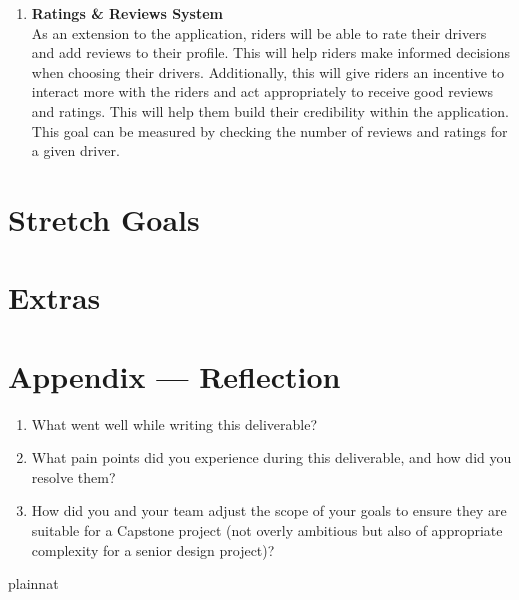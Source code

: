 \documentclass{article}
\begin{document}
\begin{enumerate}
\item \textbf{Ratings & Reviews System} \\
As an extension to the application, riders will be able to rate their drivers and add reviews to their profile. This will help riders make informed decisions when choosing their drivers. Additionally, this will give riders an incentive to interact more with the riders and act appropriately to receive good reviews and ratings. This will help them build their credibility within the application. This goal can be measured by checking the number of reviews and ratings for a given driver. 
\end{enumerate}

\section{Stretch Goals}

\section{Extras}



\newpage{}

\section*{Appendix --- Reflection}




\begin{enumerate}
    \item What went well while writing this deliverable? 
    \item What pain points did you experience during this deliverable, and how
    did you resolve them?
    \item How did you and your team adjust the scope of your goals to ensure
    they are suitable for a Capstone project (not overly ambitious but also of
    appropriate complexity for a senior design project)?
\end{enumerate}  

 {plainnat}

\end{document}
